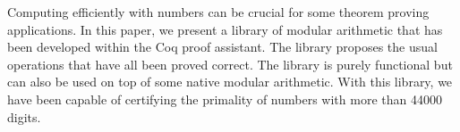 Computing efficiently with numbers can be crucial for some theorem proving applications.
In this paper, we present a library of modular arithmetic that has been developed within
the {\sc Coq} proof assistant. The library proposes the usual operations that have all been
proved correct. The library is purely functional but can also be used on top of some native
modular arithmetic. 
With this library, we have been capable of certifying the primality of numbers with
more than 44000 digits.
